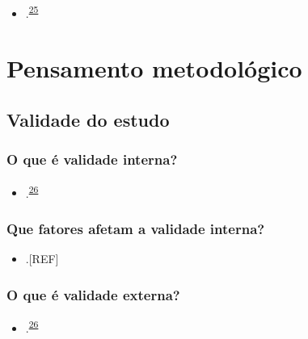 \documentclass[
  a4paper,
]{book}
\providecommand{\tightlist}{%
  \setlength{\itemsep}{0pt}\setlength{\parskip}{0pt}}
\begin{document}
\begin{itemize}
\tightlist
\item
  .\textsuperscript{\protect\hyperlink{ref-feld1991}{25}}
\end{itemize}

\hypertarget{pensamento-metodologico}{%
\chapter{\texorpdfstring{\textbf{Pensamento metodológico}}{Pensamento metodológico}}\label{pensamento-metodologico}}

\hypertarget{validade-estudo}{%
\section{Validade do estudo}\label{validade-estudo}}

\hypertarget{o-que-uxe9-validade-interna}{%
\subsection{O que é validade interna?}\label{o-que-uxe9-validade-interna}}

\begin{itemize}
\tightlist
\item
  .\textsuperscript{\protect\hyperlink{ref-findley2021}{26}}
\end{itemize}

\hypertarget{que-fatores-afetam-a-validade-interna}{%
\subsection{Que fatores afetam a validade interna?}\label{que-fatores-afetam-a-validade-interna}}

\begin{itemize}
\tightlist
\item
  .{[}REF{]}
\end{itemize}

\hypertarget{o-que-uxe9-validade-externa}{%
\subsection{O que é validade externa?}\label{o-que-uxe9-validade-externa}}

\begin{itemize}
\tightlist
\item
  .\textsuperscript{\protect\hyperlink{ref-findley2021}{26}}
\end{itemize}
\end{document}
